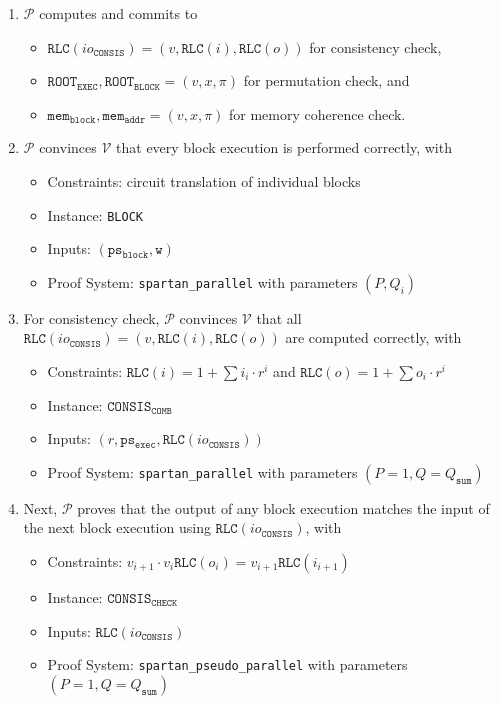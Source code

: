 \documentclass{article}
\newcommand{\code}{\texttt}
\newcommand{\Qsum}{Q_{\mathtt{sum}}}
\renewcommand{\P}{\mathcal{P}}
\newcommand{\V}{\mathcal{V}}
\newcommand{\RLC}{\mathtt{RLC}}
\newcommand{\ioc}{io_{\mathtt{CONSIS}}}
\newcommand{\ROOTE}{\mathtt{ROOT_{EXEC}}}
\newcommand{\ROOTB}{\mathtt{ROOT_{BLOCK}}}
\newcommand{\psb}{\mathtt{ps_{block}}}
\newcommand{\pse}{\mathtt{ps_{exec}}}
\newcommand{\memb}{\mathtt{mem_{block}}}
\newcommand{\mema}{\mathtt{mem_{addr}}}
\begin{document}
\begin{enumerate}
    \item $\P$ computes and commits to
    \begin{itemize}
        \item $\RLC(\ioc) = (v, \RLC(i), \RLC(o))$ for consistency check, 
        \item $\ROOTE, \ROOTB = (v, x, \pi)$ for permutation check, and
        \item $\memb, \mema = (v, x, \pi)$ for memory coherence check.
    \end{itemize}
    \item $\P$ convinces $\V$ that every block execution is performed correctly, with
    \begin{itemize}
        \item Constraints: circuit translation of individual blocks
        \item Instance: \code{BLOCK}
        \item Inputs: $(\psb, \mathtt{w})$
        \item Proof System: \code{spartan\_parallel} with parameters $(P, Q_i)$
    \end{itemize}
    \item For consistency check, $\P$ convinces $\V$ that all $\RLC(\ioc) = (v, \RLC(i), \RLC(o))$ are computed correctly, with
    \begin{itemize}
        \item Constraints: $\RLC(i) = 1 + \sum i_i\cdot r^i$ and $\RLC(o) = 1 + \sum o_i\cdot r^i$
        \item Instance: $\mathtt{CONSIS}_\mathtt{COMB}$
        \item Inputs: $(r, \pse, \RLC(\ioc))$
        \item Proof System: \code{spartan\_parallel} with parameters $(P = 1, Q = \Qsum)$
    \end{itemize}
    \item Next, $\P$ proves that the output of any block execution matches the input of the next block execution using $\RLC(\ioc)$, with
    \begin{itemize}
        \item Constraints: $v_{i+1}\cdot v_i\RLC(o_i) = v_{i+1}\RLC(i_{i+1})$
        \item Instance: $\mathtt{CONSIS}_\mathtt{CHECK}$
        \item Inputs: $\RLC(\ioc)$
        \item Proof System: \code{spartan\_pseudo\_parallel} with parameters $(P = 1, Q = \Qsum)$
    \end{itemize}

\end{enumerate}
\end{document}

